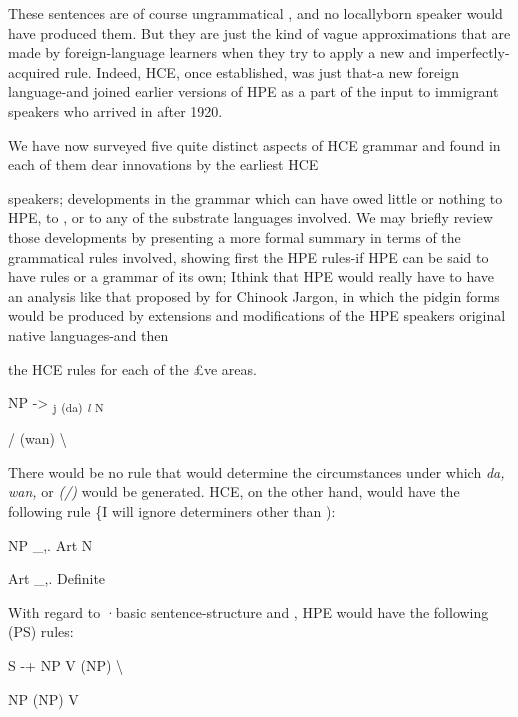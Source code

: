 These sentences are of course ungrammatical , and no locally\-born speaker would have produced them. But they are just the kind of vague approximations that are made by foreign-language learners when they try to apply a new and imperfectly-acquired rule. Indeed, HCE, once established, was just that-a new foreign language-and joined earlier versions of HPE as a part of the input to immigrant speakers who arrived in  after 1920.

We have now surveyed five quite distinct aspects of HCE gram\-mar and found in each of them dear innovations by the earliest HCE


speakers; developments in the grammar which can have owed little or nothing to HPE, to , or to any of the substrate languages involved. We may briefly review those developments by presenting a more formal summary in terms of the grammatical rules involved, showing first the HPE rules-if HPE can be said to have rules or a grammar of its own; Ithink that HPE would really have to have an analysis like that proposed by \citet{Silverstein1972} for Chinook Jargon, in which the pidgin forms would be produced by extensions and modifications of the HPE speakers original native languages-and then

the HCE rules for each of the £ve areas.


\ea\label{ex:91}
 NP {}-{\textgreater} \textsubscript{j}\textsubscript{ }\textsubscript{(da) }\textit{\textsubscript{l}}\textsubscript{ }\textsubscript{N}
\glt
\z

/ (wan) {\textbackslash}

There would be no rule that would determine the circumstances under which \textit{da,} \textit{wan,} or \textit{(/)} would be generated. HCE, on the other hand, would have the following rule \{I will ignore determiners other than ): 

\ea\label{ex:92}
 NP \_,. Art N
\glt
\z

\ea\label{ex:93}
 Art \_,. Definite
\glt
\z

With regard to ·basic sentence-structure and , HPE would have the following  (PS) rules: 

\ea\label{ex:86}
 S {}-+ NP V (NP) {\textbackslash}
\glt
\z

NP (NP) V

\ea\label{ex:94}

